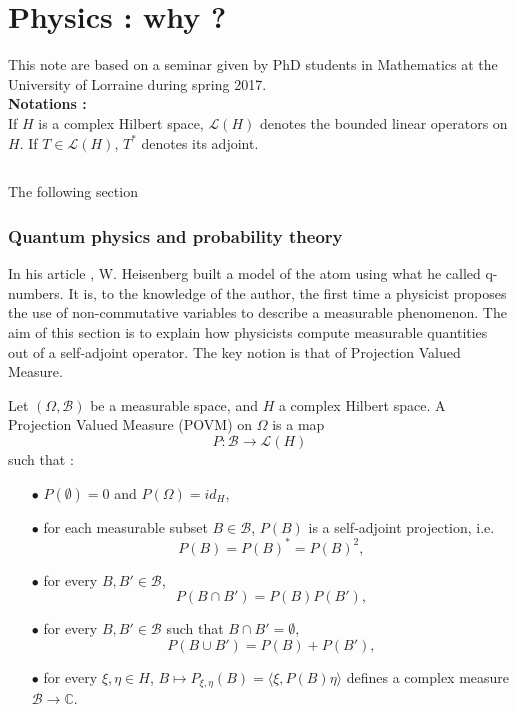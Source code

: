 \chapter{Physics : why ?}
This note are based on a seminar given by PhD students in Mathematics at the University of Lorraine during spring 2017. \\

\textbf{Notations :} \\
If $H$ is a complex Hilbert space, $\mathcal L(H)$ denotes the bounded linear operators on $H$. If $T\in\mathcal L(H)$, $T^*$ denotes its adjoint. 

\section{}

The following section 
\subsection{Quantum physics and probability theory}

In his article \cite{Heisenberg}, W. Heisenberg built a model of the atom using what he called q-numbers. It is, to the knowledge of the author, the first time a physicist proposes the use of non-commutative variables to describe a measurable phenomenon. The aim of this section is to explain how physicists compute measurable quantities out of a self-adjoint operator. The key notion is that of Projection Valued Measure.

\begin{definition}
Let $(\Omega,\mathcal B)$ be a measurable space, and $H$ a complex Hilbert space. A Projection Valued Measure (POVM) on $\Omega$ is a map
\[P :\mathcal B \rightarrow \mathcal L(H) \]
such that :
\begin{itemize}
\item[$\bullet$] $P(\emptyset) = 0$ and $P(\Omega)= id_H$,
\item[$\bullet$] for each measurable subset $B\in \mathcal B$, $ P(B)$ is a self-adjoint projection, i.e. \[ P(B)=P(B)^*=P(B)^2,\] 
\item[$\bullet$] for every $B,B'\in \mathcal B$, \[P(B\cap B') = P(B)P(B'),\]
\item[$\bullet$] for every $B,B'\in \mathcal B$ such that $B\cap B' = \emptyset$, \[P(B\cup B') = P(B)+P(B'),\]
\item[$\bullet$] for every $\xi,\eta\in H$, $B\mapsto P_{\xi,\eta}(B) = \langle \xi, P(B)\eta\rangle$ defines a complex measure $\mathcal B \rightarrow \mathbb C$.
\end{itemize}
\end{definition}

